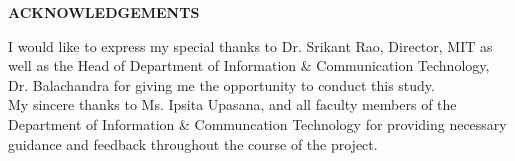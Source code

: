 \begin{center}
\large{\textbf{ACKNOWLEDGEMENTS}}\\
\vspace{1cm}
\end{center}
I would like to express my special thanks to Dr. Srikant Rao, Director, MIT as well as the Head of Department of Information \& Communication Technology, Dr. Balachandra for giving me the opportunity to conduct this study.\\
My sincere thanks to Ms. Ipsita Upasana, and all faculty members of the Department of Information \& Communcation Technology for providing necessary guidance and feedback throughout the course of the project.

